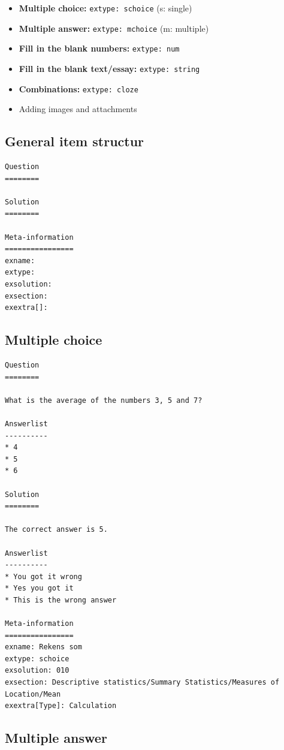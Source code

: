\documentclass[
]{article}
\providecommand{\tightlist}{%
  \setlength{\itemsep}{0pt}\setlength{\parskip}{0pt}}
\begin{document}
\begin{itemize}
\tightlist
\item
  \textbf{Multiple choice:} \texttt{extype:\ schoice} (s: single)
\item
  \textbf{Multiple answer:} \texttt{extype:\ mchoice} (m: multiple)
\item
  \textbf{Fill in the blank numbers:} \texttt{extype:\ num}
\item
  \textbf{Fill in the blank text/essay:} \texttt{extype:\ string}
\item
  \textbf{Combinations:} \texttt{extype:\ cloze}
\item
  Adding images and attachments
\end{itemize}

\hypertarget{general-item-structur}{%
\subsection{General item structur}\label{general-item-structur}}

\begin{verbatim}
Question
========

Solution
========

Meta-information
================
exname: 
extype: 
exsolution: 
exsection: 
exextra[]:
\end{verbatim}

\hypertarget{multiple-choice}{%
\subsection{Multiple choice}\label{multiple-choice}}

\begin{verbatim}
Question
========

What is the average of the numbers 3, 5 and 7?

Answerlist
----------
* 4
* 5
* 6

Solution
========

The correct answer is 5.

Answerlist
----------
* You got it wrong
* Yes you got it
* This is the wrong answer

Meta-information
================
exname: Rekens som
extype: schoice
exsolution: 010
exsection: Descriptive statistics/Summary Statistics/Measures of Location/Mean
exextra[Type]: Calculation
\end{verbatim}

\hypertarget{multiple-answer}{%
\subsection{Multiple answer}\label{multiple-answer}}
\end{document}
